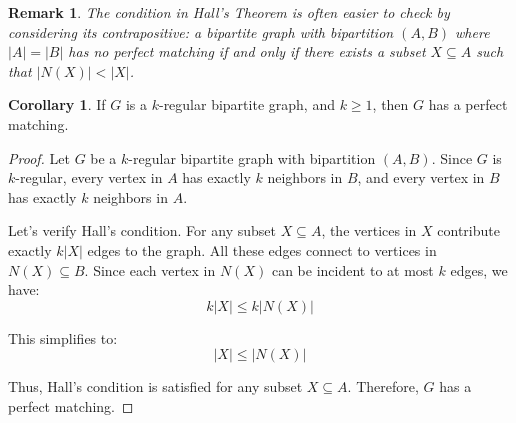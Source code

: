 \documentclass{article}
\newtheorem{remark}{Remark}
\theoremstyle{definition}
\newtheorem{corollary}{Corollary}
\begin{document}
\begin{remark}
The condition in Hall's Theorem is often easier to check by considering its contrapositive: a bipartite graph with bipartition $(A,B)$ where $|A| = |B|$ has no perfect matching if and only if there exists a subset $X \subseteq A$ such that $|N(X)| < |X|$.
\end{remark}

\begin{corollary}
If $G$ is a $k$-regular bipartite graph, and $k \geq 1$, then $G$ has a perfect matching.
\end{corollary}

\begin{proof}
Let $G$ be a $k$-regular bipartite graph with bipartition $(A,B)$. Since $G$ is $k$-regular, every vertex in $A$ has exactly $k$ neighbors in $B$, and every vertex in $B$ has exactly $k$ neighbors in $A$. 

Let's verify Hall's condition. For any subset $X \subseteq A$, the vertices in $X$ contribute exactly $k|X|$ edges to the graph. All these edges connect to vertices in $N(X) \subseteq B$. Since each vertex in $N(X)$ can be incident to at most $k$ edges, we have:
\[k|X| \leq k|N(X)|\]

This simplifies to:
\[|X| \leq |N(X)|\]

Thus, Hall's condition is satisfied for any subset $X \subseteq A$. Therefore, $G$ has a perfect matching.
\end{proof}
\end{document}
